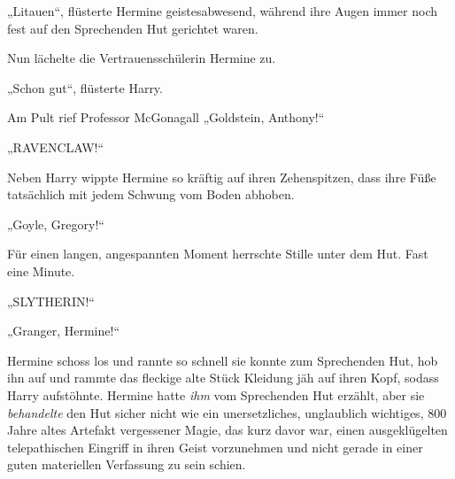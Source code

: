 



„Litauen“, flüsterte Hermine geistesabwesend, während ihre Augen immer noch fest auf den Sprechenden Hut gerichtet waren.

Nun lächelte die Vertrauensschülerin Hermine zu.

„Schon gut“, flüsterte Harry.

Am Pult rief Professor McGonagall „Goldstein, Anthony!“

„RAVENCLAW!“

Neben Harry wippte Hermine so kräftig auf ihren Zehenspitzen, dass ihre Füße tatsächlich mit jedem Schwung vom Boden abhoben.

„Goyle, Gregory!“

Für einen langen, angespannten Moment herrschte Stille unter dem Hut. Fast eine Minute.

„SLYTHERIN!“

„Granger, Hermine!“

Hermine schoss los und rannte so schnell sie konnte zum Sprechenden Hut, hob ihn auf und rammte das fleckige alte Stück Kleidung jäh auf ihren Kopf, sodass Harry aufstöhnte. Hermine hatte \emph{ihm} vom Sprechenden Hut erzählt, aber sie \emph{behandelte} den Hut sicher nicht wie ein unersetzliches, unglaublich wichtiges, 800 Jahre altes Artefakt vergessener Magie, das kurz davor war, einen ausgeklügelten telepathischen Eingriff in ihren Geist vorzunehmen und nicht gerade in einer guten materiellen Verfassung zu sein schien.

